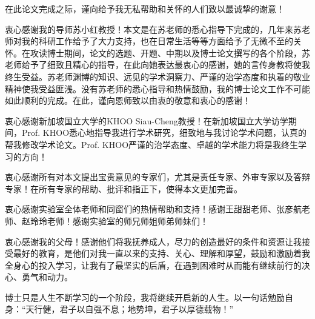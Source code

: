 

在此论文完成之际，谨向给予我无私帮助和关怀的人们致以最诚挚的谢意！

衷心感谢我的导师苏小红教授！本文是在苏老师的悉心指导下完成的，几年来苏老师对我的科研工作给予了大力支持，也在日常生活等等方面给予了无微不至的关怀。在攻读博士期间，论文的选题、开题、中期以及博士论文撰写的各个阶段，苏老师给予了细致且精心的指导，在此向她表达最衷心的感谢，她的言传身教将使我终生受益。苏老师渊博的知识、远见的学术洞察力、严谨的治学态度和执着的敬业精神使我受益匪浅。没有苏老师的悉心指导和热情鼓励，我的博士论文工作不可能如此顺利的完成。在此，谨向恩师致以由衷的敬意和衷心的感谢！

衷心感谢新加坡国立大学的KHOO Siau-Cheng教授！在新加坡国立大学访学期间，Prof. KHOO悉心地指导我进行学术研究，细致地与我讨论学术问题，认真的帮我修改学术论文。Prof. KHOO严谨的治学态度、卓越的学术能力将是我终生学习的方向！

衷心感谢所有对本文提出宝贵意见的专家们，尤其是责任专家、外审专家以及答辩专家！在所有专家的帮助、批评和指正下，使得本文更加完善。

衷心感谢实验室全体老师和同窗们的热情帮助和支持！感谢王甜甜老师、张彦航老师、赵玲玲老师！感谢实验室的师兄师姐师弟师妹们！

衷心感谢我的父母！感谢他们将我抚养成人，尽力的创造最好的条件和资源让我接受最好的教育，是他们对我一直以来的支持、关心、理解和厚望，鼓励和激励着我全身心的投入学习，让我有了最坚实的后盾，在遇到困难时从而能有继续前行的决心、勇气和动力。

博士只是人生不断学习的一个阶段，我将继续开启新的人生。以一句话勉励自身：“天行健，君子以自强不息；地势坤，君子以厚德载物！”
